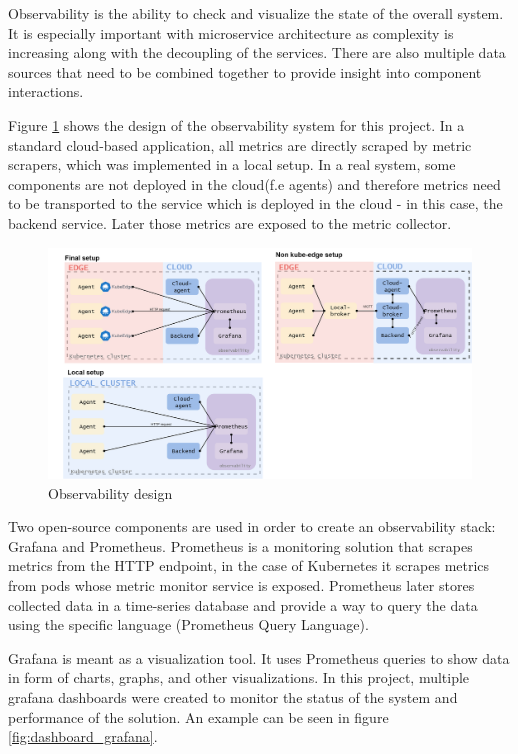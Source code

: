 Observability is the ability to check and visualize the state of the overall system. It is especially important with microservice architecture as complexity is increasing along with the decoupling of the services. There are also multiple data sources that need to be combined together to provide insight into component interactions. 

Figure \ref{fig:observability_system} shows the design of the observability system for this project. In a standard cloud-based application, all metrics are directly scraped by metric scrapers, which was implemented in a local setup. In a real system, some components are not deployed in the cloud(f.e agents) and therefore metrics need to be transported to the service which is deployed in the cloud - in this case, the backend service. Later those metrics are exposed to the metric collector.

\begin{figure}[H]
    \centering
    \includegraphics[width=\textwidth]{pictures/observability.png}
    \caption{ Observability design }
    \label{fig:observability_system}
\end{figure}

Two open-source components are used in order to create an observability stack: Grafana and Prometheus. Prometheus is a monitoring solution that scrapes metrics from the HTTP endpoint, in the case of Kubernetes it scrapes metrics from pods whose metric monitor service is exposed. Prometheus later stores collected data in a time-series database and provide a way to query the data using the specific language (Prometheus Query Language)\cite{prometheus_docs}.

Grafana is meant as a visualization tool. It uses Prometheus queries to show data in form of charts, graphs, and other visualizations. In this project, multiple grafana dashboards were created to monitor the status of the system and performance of the solution. An example can be seen in figure \ref{fig:dashboard_grafana}.


